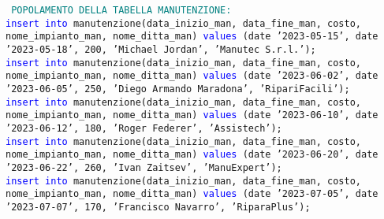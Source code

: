 \documentclass{article}
\begin{document}
    \begin{flushleft}
        \texttt{
        \textcolor{teal}{POPOLAMENTO DELLA TABELLA MANUTENZIONE:} \\
        \hspace*{0.5em}\textcolor{blue}{insert into} manutenzione(data\_inizio\_man, data\_fine\_man, costo, \hspace*{0.5em}nome\_impianto\_man, nome\_ditta\_man) \textcolor{blue}{values} (date '2023-05-15', date '2023-05-18', \hspace*{0.5em}200, 'Michael Jordan', 'Manutec S.r.l.'); \\
        \vspace{2mm}
        \hspace*{0.5em}\textcolor{blue}{insert into} manutenzione(data\_inizio\_man, data\_fine\_man, costo, \hspace*{0.5em}nome\_impianto\_man, nome\_ditta\_man) \textcolor{blue}{values} (date '2023-06-02', date '2023-06-05', \hspace*{0.5em}250, 'Diego Armando Maradona', 'RipariFacili'); \\
        \vspace{2mm}
        \hspace*{0.5em}\textcolor{blue}{insert into} manutenzione(data\_inizio\_man, data\_fine\_man, costo, \hspace*{0.5em}nome\_impianto\_man, nome\_ditta\_man) \textcolor{blue}{values} (date '2023-06-10', date '2023-06-12', \hspace*{0.5em}180, 'Roger Federer', 'Assistech'); \\
        \vspace{2mm}
        \hspace*{0.5em}\textcolor{blue}{insert into} manutenzione(data\_inizio\_man, data\_fine\_man, costo, \hspace*{0.5em}nome\_impianto\_man, nome\_ditta\_man) \textcolor{blue}{values} (date '2023-06-20', date '2023-06-22', \hspace*{0.5em}260, 'Ivan Zaitsev', 'ManuExpert'); \\
        \vspace{2mm}
        \hspace*{0.5em}\textcolor{blue}{insert into} manutenzione(data\_inizio\_man, data\_fine\_man, costo, \hspace*{0.5em}nome\_impianto\_man, nome\_ditta\_man) \textcolor{blue}{values} (date '2023-07-05', date '2023-07-07', \hspace*{0.5em}170, 'Francisco Navarro', 'RiparaPlus'); \\
}
\end{flushleft}
\end{document}
